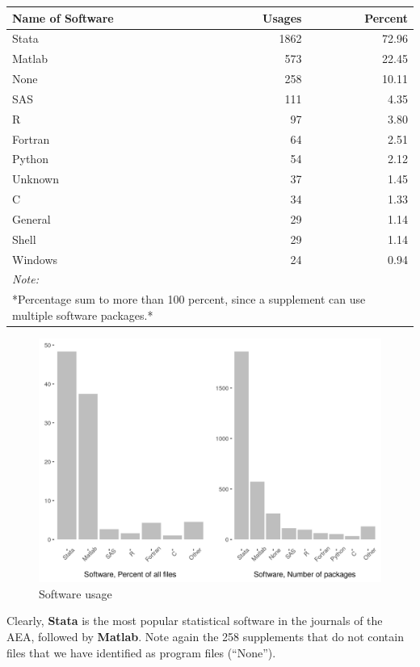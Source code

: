 \documentclass[]{article}
\begin{document}
\begin{table}[H]
\centering
\begin{tabular}{l|r|r}
\hline
Name of Software & Usages & Percent\\
\hline
Stata & 1862 & 72.96\\
\hline
Matlab & 573 & 22.45\\
\hline
None & 258 & 10.11\\
\hline
SAS & 111 & 4.35\\
\hline
R & 97 & 3.80\\
\hline
Fortran & 64 & 2.51\\
\hline
Python & 54 & 2.12\\
\hline
Unknown & 37 & 1.45\\
\hline
C & 34 & 1.33\\
\hline
General & 29 & 1.14\\
\hline
Shell & 29 & 1.14\\
\hline
Windows & 24 & 0.94\\
\hline
\multicolumn{3}{l}{\textit{Note: }}\\
\multicolumn{3}{l}{*Percentage sum to more than 100 percent, since a supplement can use multiple software packages.*}\\
\end{tabular}
\end{table}

\begin{figure}
\centering
\includegraphics{figure_software.png}
\caption{Software usage}
\end{figure}

Clearly, \textbf{Stata} is the most popular statistical software in the
journals of the AEA, followed by \textbf{Matlab}. Note again the 258
supplements that do not contain files that we have identified as program
files (``None'').
\end{document}
